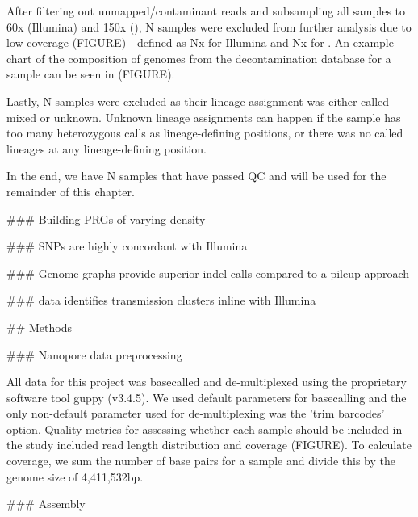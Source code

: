 \begin{markdown}
After filtering out unmapped/contaminant reads and subsampling all samples to 60x (Illumina) and 150x (\ont{}), N samples were excluded from further analysis due to low coverage (FIGURE) - defined as Nx for Illumina and Nx for \ont{}. An example chart of the composition of genomes from the decontamination database for a sample can be seen in (FIGURE).  

Lastly, N samples were excluded as their lineage assignment was either called mixed or unknown. Unknown lineage assignments can happen if the sample has too many heterozygous calls as lineage-defining positions, or there was no called lineages at any lineage-defining position.  

In the end, we have N samples that have passed QC and will be used for the remainder of this chapter.



### Building PRGs of varying density

### \ont{} SNPs are highly concordant with Illumina

### Genome graphs provide superior \ont{} indel calls compared to a pileup approach

### \ont{} data identifies transmission clusters inline with Illumina


## Methods

### Nanopore data preprocessing

All \ont{} data for this project was basecalled and de-multiplexed using the \ont{} proprietary software tool guppy (v3.4.5). We used default parameters for basecalling and the only non-default parameter used for de-multiplexing was the 'trim barcodes' option.  
Quality metrics for assessing whether each sample should be included in the study included read length distribution and coverage (FIGURE). To calculate coverage, we sum the number of base pairs for a sample and divide this by the \mtb{} genome size of 4,411,532bp.


### Assembly


\end{markdown}
